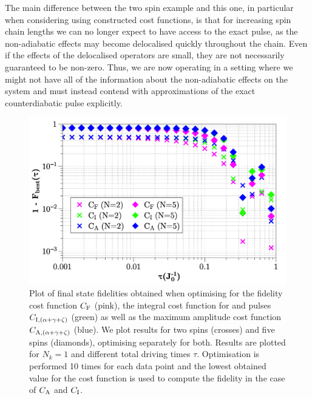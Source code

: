 The main difference between the two spin example and this one, in particular when considering using  constructed cost functions, is that for increasing spin chain lengths we can no longer expect to have access to the exact  pulse, as the non-adiabatic effects may become delocalised quickly throughout the chain. Even if the effects of the delocalised  operators are small, they are not necessarily guaranteed to be non-zero. Thus, we are now operating in a setting where we might not have all of the information about the non-adiabatic effects on the system and must instead contend with  approximations of the exact counterdiabatic pulse explicitly.
\begin{figure}[t]
    \centering
    \includegraphics[width=0.8\linewidth]{images_v1/No_cd_higher_order.png} \caption[Plot of final state fidelity for the Ising spin chain for different cost functions and no counterdiabatic component in the implementation.]{Plot of final state fidelities obtained when optimising for the fidelity cost function $C_{\rm F}$ (pink), the integral cost function for  and   pulses $C_{\rm I, (\alpha + \gamma + \zeta)}$ (green) as well as the maximum amplitude cost function $C_{\rm A, (\alpha + \gamma + \zeta)}$ (blue). We plot results for two spins (crosses) and five spins (diamonds), optimising separately for both. Results are plotted for $N_k = 1$ and different total driving times $\tau$. Optimisation is performed 10 times for each data point and the lowest obtained value for the cost function is used to compute the fidelity in the case of $C_{\rm A}$ and $C_{\rm I}$.}\label{fig:ising_nocd_higher_order}
\end{figure}

